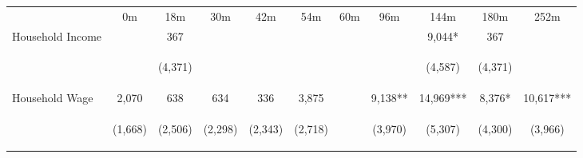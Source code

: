 \begin{tabular}{lcccccccccc}
\hline \noalign{\smallskip} & 0m & 18m & 30m & 42m & 54m & 60m & 96m & 144m & 180m & 252m\\
\noalign{\smallskip}\hline \noalign{\smallskip}Household Income &  & 367 &  &  &  &  &  & 9,044* & 367 & \\
 & \begin{footnotesize}\end{footnotesize} & \begin{footnotesize}(4,371)\end{footnotesize} & \begin{footnotesize}\end{footnotesize} & \begin{footnotesize}\end{footnotesize} & \begin{footnotesize}\end{footnotesize} & \begin{footnotesize}\end{footnotesize} & \begin{footnotesize}\end{footnotesize} & \begin{footnotesize}(4,587)\end{footnotesize} & \begin{footnotesize}(4,371)\end{footnotesize} & \begin{footnotesize}\end{footnotesize}\\
\noalign{\smallskip}Household Wage & 2,070 & 638 & 634 & 336 & 3,875 &  & 9,138** & 14,969*** & 8,376* & 10,617***\\
 & \begin{footnotesize}(1,668)\end{footnotesize} & \begin{footnotesize}(2,506)\end{footnotesize} & \begin{footnotesize}(2,298)\end{footnotesize} & \begin{footnotesize}(2,343)\end{footnotesize} & \begin{footnotesize}(2,718)\end{footnotesize} & \begin{footnotesize}\end{footnotesize} & \begin{footnotesize}(3,970)\end{footnotesize} & \begin{footnotesize}(5,307)\end{footnotesize} & \begin{footnotesize}(4,300)\end{footnotesize} & \begin{footnotesize}(3,966)\end{footnotesize}\\

\end{tabular}

